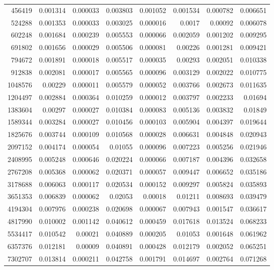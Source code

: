 \begin{longtable}{r r r r r r r r}
456419 & 0.001314 & 0.000033 & 0.003803 & 0.001052 & 0.001534 & 0.000782 & 0.006651 \\
524288 & 0.001353 & 0.000033 & 0.003025 & 0.000016 & 0.0017 & 0.00092 & 0.006078 \\
602248 & 0.001684 & 0.000239 & 0.005553 & 0.000066 & 0.002059 & 0.001202 & 0.009295 \\
691802 & 0.001656 & 0.000029 & 0.005506 & 0.000081 & 0.00226 & 0.001281 & 0.009421 \\
794672 & 0.001891 & 0.000018 & 0.005517 & 0.000035 & 0.00293 & 0.002051 & 0.010338 \\
912838 & 0.002081 & 0.000017 & 0.005565 & 0.000096 & 0.003129 & 0.002022 & 0.010775 \\
1048576 & 0.00229 & 0.000011 & 0.005579 & 0.000052 & 0.003766 & 0.002673 & 0.011635 \\
1204497 & 0.002884 & 0.000364 & 0.010259 & 0.000012 & 0.003797 & 0.002233 & 0.01694 \\
1383604 & 0.00297 & 0.000027 & 0.010384 & 0.000083 & 0.005136 & 0.003832 & 0.01849 \\
1589344 & 0.003284 & 0.000027 & 0.010456 & 0.000103 & 0.005904 & 0.004397 & 0.019644 \\
1825676 & 0.003744 & 0.000109 & 0.010568 & 0.000028 & 0.006631 & 0.004848 & 0.020943 \\
2097152 & 0.004174 & 0.000054 & 0.01055 & 0.000096 & 0.007223 & 0.005256 & 0.021946 \\
2408995 & 0.005248 & 0.000646 & 0.020224 & 0.000066 & 0.007187 & 0.004396 & 0.032658 \\
2767208 & 0.005368 & 0.000062 & 0.020371 & 0.000057 & 0.009447 & 0.006652 & 0.035186 \\
3178688 & 0.006063 & 0.000117 & 0.020534 & 0.000152 & 0.009297 & 0.005824 & 0.035893 \\
3651353 & 0.006839 & 0.000062 & 0.02053 & 0.00018 & 0.01211 & 0.008693 & 0.039479 \\
4194304 & 0.007976 & 0.000238 & 0.020698 & 0.000067 & 0.007943 & 0.001547 & 0.036617 \\
4817990 & 0.010002 & 0.001142 & 0.040612 & 0.000459 & 0.017618 & 0.013524 & 0.068233 \\
5534417 & 0.010542 & 0.00021 & 0.040889 & 0.000205 & 0.01053 & 0.001648 & 0.061962 \\
6357376 & 0.012181 & 0.00009 & 0.040891 & 0.000428 & 0.012179 & 0.002052 & 0.065251 \\
7302707 & 0.013814 & 0.000211 & 0.042758 & 0.001791 & 0.014697 & 0.002764 & 0.071268 \\

\end{longtable}
